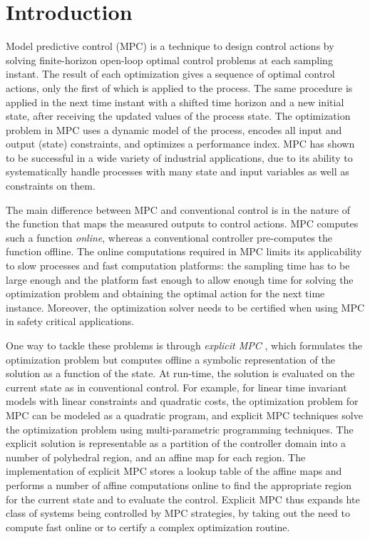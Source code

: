 \section{Introduction}

Model predictive control (MPC) is a technique to design control actions by solving finite-horizon open-loop
optimal control problems at each sampling instant.
The result of each optimization gives a sequence of optimal control actions, only the first of which is applied
to the process.
The same procedure is applied in the next time instant with a shifted time horizon and a new initial state, 
after receiving the updated values of the process state.
The optimization problem in MPC uses a dynamic model of the process, encodes all input and output (state) constraints, and 
optimizes a performance index. 
MPC has shown to be successful in a wide variety of industrial applications, due to its 
ability to systematically handle processes with many state and input variables as well as constraints on them. 

The main difference between MPC and conventional control is in the nature of the function that maps the measured outputs to control actions. 
MPC computes such a function \emph{online}, whereas a conventional controller pre-computes the function offline.
The online computations required in MPC limits its applicability to slow processes and fast computation platforms: 
the sampling time has to be large enough and the platform fast enough to allow enough time for solving the optimization problem
and obtaining the optimal action for the next time instance. 
Moreover, the optimization solver needs to be certified when using MPC in safety critical applications.

One way to tackle these problems is through \emph{explicit MPC} \cite{Bemporad:2002,Alessio2009}, which formulates the optimization
problem but computes offline a symbolic representation of the solution as a function of the state.
At run-time, the solution is evaluated on the current state as in conventional control.
For example, for linear time invariant models with linear constraints and quadratic costs, the optimization
problem for MPC can be modeled as a quadratic program, and explicit MPC techniques solve the optimization problem
using multi-parametric programming techniques.
The explicit solution is representable as a partition of the controller domain into a number of polyhedral region,
and an affine map for each region.
The implementation of explicit MPC stores a lookup table of the affine maps and performs a number of affine computations
online to find the appropriate region for the current state and to evaluate the control.  
Explicit MPC thus expands hte class of systems being controlled by MPC strategies, by taking out the need to compute fast online
or to certify a complex optimization routine.

